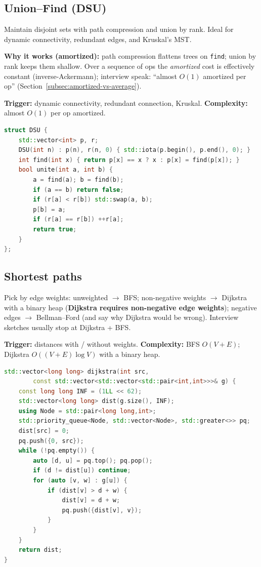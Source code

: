 \subsection{Union--Find (DSU)}
\label{subsec:pat-uf}
Maintain disjoint sets with path compression and union by rank. Ideal for
dynamic connectivity, redundant edges, and Kruskal's MST.

\par\noindent\textbf{Why it works (amortized):} path compression flattens trees
on \texttt{find}; union by rank keeps them shallow. Over a sequence of ops the
\emph{amortized} cost is effectively constant (inverse-Ackermann); interview
speak: ``almost $O(1)$ amortized per op''
(Section~\ref{subsec:amortized-vs-average}).

\textbf{Trigger:} dynamic connectivity, redundant connection, Kruskal.
\newline
\textbf{Complexity:} almost $O(1)$ per op amortized.

\begin{lstlisting}[language=C++]
struct DSU {
    std::vector<int> p, r;
    DSU(int n) : p(n), r(n, 0) { std::iota(p.begin(), p.end(), 0); }
    int find(int x) { return p[x] == x ? x : p[x] = find(p[x]); }
    bool unite(int a, int b) {
        a = find(a); b = find(b);
        if (a == b) return false;
        if (r[a] < r[b]) std::swap(a, b);
        p[b] = a;
        if (r[a] == r[b]) ++r[a];
        return true;
    }
};
\end{lstlisting}

\subsection{Shortest paths}
\label{subsec:pat-shortest}
Pick by edge weights: unweighted $\rightarrow$ BFS; non-negative weights
$\rightarrow$ Dijkstra with a binary heap
(\textbf{Dijkstra requires non-negative edge weights});
negative edges $\rightarrow$ Bellman--Ford
(and say why Dijkstra would be wrong). Interview sketches usually stop at
Dijkstra + BFS.

\textbf{Trigger:} distances with / without weights.
\newline
\textbf{Complexity:} BFS $O(V+E)$; Dijkstra $O((V+E)\log V)$ with a binary heap.

\begin{lstlisting}[language=C++]
std::vector<long long> dijkstra(int src,
        const std::vector<std::vector<std::pair<int,int>>>& g) {
    const long long INF = (1LL << 62);
    std::vector<long long> dist(g.size(), INF);
    using Node = std::pair<long long,int>;
    std::priority_queue<Node, std::vector<Node>, std::greater<>> pq;
    dist[src] = 0;
    pq.push({0, src});
    while (!pq.empty()) {
        auto [d, u] = pq.top(); pq.pop();
        if (d != dist[u]) continue;
        for (auto [v, w] : g[u]) {
            if (dist[v] > d + w) {
                dist[v] = d + w;
                pq.push({dist[v], v});
            }
        }
    }
    return dist;
}
\end{lstlisting}

